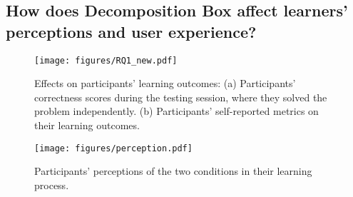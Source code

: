



\subsection{How does Decomposition Box affect learners’ perceptions and user experience?}



\begin{figure*}[htbp]
	\centering 
	\texttt{[image: figures/RQ1\_new.pdf]}
	\caption{Effects on participants' learning outcomes: (a) Participants' correctness scores during the testing session, where they solved the problem independently. (b) Participants' self-reported metrics on their learning outcomes.}
	\label{RQ1}
        \Description{}
\end{figure*}


\begin{figure*}[htbp]
	\centering 
	\texttt{[image: figures/perception.pdf]}
	\caption{Participants' perceptions of the two conditions in their learning process.}
	\label{perception}
        \Description{}
\end{figure*}


